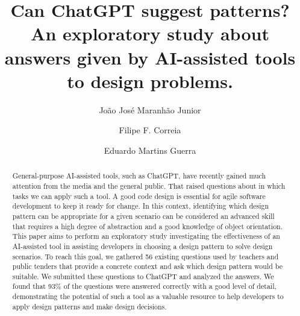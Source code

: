 \documentclass[runningheads]{llncs}
\begin{document}
\mainmatter 
\title{Can ChatGPT suggest patterns? An exploratory study about answers given by AI-assisted tools to design problems.}
\author{João José Maranhão Junior \and Filipe F. Correia
\and Eduardo Martins Guerra}

\maketitle 
\begin{abstract}
General-purpose AI-assisted tools, such as ChatGPT, have recently gained much attention from the media and the general public. That raised questions about in which tasks we can apply such a tool. A good code design is essential for agile software development to keep it ready for change. In this context, identifying which design pattern can be appropriate for a given scenario can be considered an advanced skill that requires a high degree of abstraction and a good knowledge of object orientation. This paper aims to perform an exploratory study investigating the effectiveness of an AI-assisted tool in assisting developers in choosing a design pattern to solve design scenarios. To reach this goal, we gathered 56 existing questions used by teachers and public tenders that provide a concrete context and ask which design pattern would be suitable. We submitted these questions to ChatGPT and analyzed the answers. We found that 93\% of the questions were answered correctly with a good level of detail, demonstrating the potential of such a tool as a valuable resource to help developers to apply design patterns and make design decisions.
\end{abstract}
\end{document}
